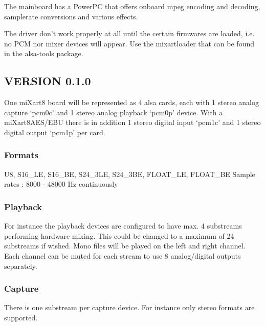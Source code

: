 \documentclass[a4paper,8pt,english]{sphinxmanual}
\begin{document}
The mainboard has a PowerPC that offers onboard mpeg encoding and
decoding, samplerate conversions and various effects.

The driver don't work properly at all until the certain firmwares
are loaded, i.e. no PCM nor mixer devices will appear.
Use the mixartloader that can be found in the alsa-tools package.


\subsection{VERSION 0.1.0}
\label{sound/cards/mixart:version-0-1-0}
One miXart8 board will be represented as 4 alsa cards, each with 1
stereo analog capture `pcm0c' and 1 stereo analog playback `pcm0p' device.
With a miXart8AES/EBU there is in addition 1 stereo digital input
`pcm1c' and 1 stereo digital output `pcm1p' per card.


\subsubsection{Formats}
\label{sound/cards/mixart:formats}
U8, S16\_LE, S16\_BE, S24\_3LE, S24\_3BE, FLOAT\_LE, FLOAT\_BE
Sample rates : 8000 - 48000 Hz continuously


\subsubsection{Playback}
\label{sound/cards/mixart:playback}
For instance the playback devices are configured to have max. 4
substreams performing hardware mixing. This could be changed to a
maximum of 24 substreams if wished.
Mono files will be played on the left and right channel. Each channel
can be muted for each stream to use 8 analog/digital outputs separately.


\subsubsection{Capture}
\label{sound/cards/mixart:capture}
There is one substream per capture device. For instance only stereo
formats are supported.
\end{document}
